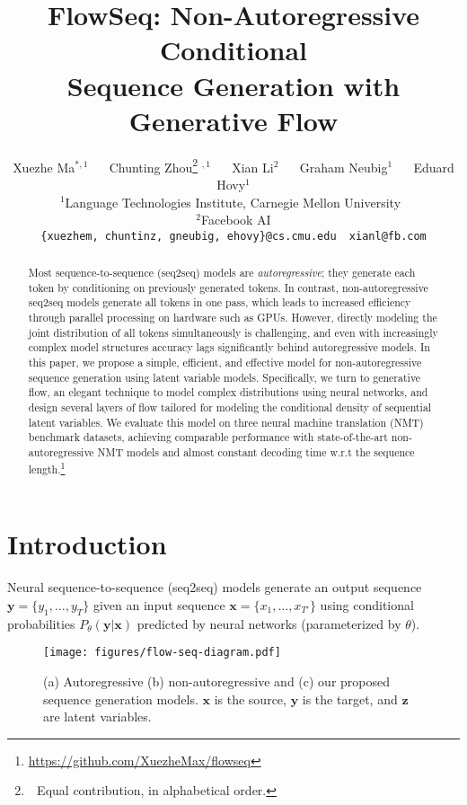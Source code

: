 \documentclass[11pt,a4paper]{article}
\title{FlowSeq:  Non-Autoregressive Conditional \\ Sequence Generation with Generative Flow}
\author{Xuezhe Ma$^{*,1}$ $\quad$ Chunting Zhou\thanks{$\,\,$ Equal contribution, in alphabetical order.}$\,\,^{,1}$ $\quad$ Xian Li$^2$ $\quad$ Graham Neubig$^1$ $\quad$ Eduard Hovy$^1$ \\
  $^1$Language Technologies Institute, Carnegie Mellon University $\,$\\ $^2$Facebook AI \\
     {\tt \{xuezhem, chuntinz, gneubig, ehovy\}@cs.cmu.edu ~xianl@fb.com} \\
}
\date{}
\begin{document}
\maketitle
\begin{abstract}
Most sequence-to-sequence (seq2seq) models are \emph{autoregressive}; they generate each token by conditioning on previously generated tokens.
In contrast, non-autoregressive seq2seq models generate all tokens in one pass, which leads to increased efficiency through parallel processing on hardware such as GPUs. 
However, directly modeling the joint distribution of all tokens simultaneously is challenging, and even with increasingly complex model structures accuracy lags significantly behind autoregressive models.
In this paper, we propose a simple, efficient, and effective model for non-autoregressive sequence generation using latent variable models.
Specifically, we turn to generative flow, an elegant technique to model complex distributions using neural networks, and design several layers of flow tailored for modeling the conditional density of sequential latent variables.
We evaluate this model on three neural machine translation (NMT) benchmark datasets, achieving comparable performance with state-of-the-art non-autoregressive NMT models and almost constant decoding time w.r.t the sequence length.\footnote{\url{https://github.com/XuezheMax/flowseq}}
\end{abstract}

\section{Introduction}

Neural sequence-to-sequence (seq2seq) models \citep{bahdanau2014neural,rush2015neural,vinyals2015show,vaswani2017attention} generate an output sequence $\mathbf{y} = \{y_1, \ldots, y_T\}$ given an input sequence $\mathbf{x} = \{x_1, \ldots, x_{T'}\}$ using conditional probabilities $P_\theta(\mathbf{y}|\mathbf{x})$ predicted by neural networks (parameterized by $\theta$).

\begin{figure}[tb]
  \centering
  \texttt{[image: figures/flow-seq-diagram.pdf]}
  \caption{(a) Autoregressive (b) non-autoregressive and (c) our proposed sequence generation models. $\mathbf{x}$ is the source, $\mathbf{y}$ is the target, and $\mathbf{z}$ are latent variables.} \label{fig:diagram}
  \vspace{-4mm}
\end{figure}
\end{document}
